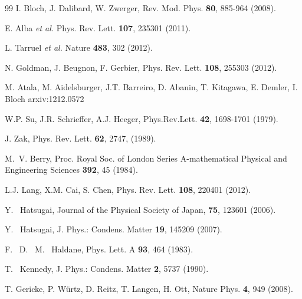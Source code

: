 \documentclass[pra,aps,twocolumn,showpacs]{revtex4}
\begin{document}
\begin{thebibliography}{99}
 I. Bloch, J. Dalibard, W. Zwerger, 
Rev. Mod. Phys. {\bf 80}, 885-964 (2008).

E. Alba {\it et al.} %
Phys. Rev. Lett. \textbf{107},  235301 (2011).

 L. Tarruel {\it et al.} %
Nature \textbf{483}, 302 (2012).

N. Goldman, J. Beugnon, F. Gerbier, 
Phys. Rev. Lett. \textbf{108}, 255303 (2012).


 M. Atala, M. Aidelsburger, J.T. Barreiro, D. Abanin, T. Kitagawa, E. Demler, I. Bloch
arxiv:1212.0572

W.P. Su, J.R. Schrieffer, A.J. Heeger, 
Phys.Rev.Lett. \textbf{42}, 1698-1701 (1979).

 J. Zak, Phys. Rev. Lett. \textbf{62},
  2747, (1989).

 M.~V. Berry,
  Proc. Royal Soc. of London Series
  A-mathematical Physical and Engineering Sciences
  \textbf{392}, 45 (1984).
  
L.J. Lang, X.M. Cai, S. Chen, 
Phys. Rev. Lett. \textbf{108}, 220401 (2012).

 Y.~ Hatsugai,
  Journal of the Physical Society of Japan,
  \textbf{75}, 123601 (2006).

 Y.~ Hatsugai,
 J. Phys.: Condens. Matter \textbf{19}, 145209 (2007).

 F.~ D.~ M.~ Haldane,
  Phys. Lett. A \textbf{93}, 464 (1983).  
      
 T.~ Kennedy,
J. Phys.: Condens. Matter \textbf{2}, 5737 (1990). 
  
 T. Gericke, P. W\"urtz, D. Reitz, T. Langen, H. Ott,
Nature Phys. \textbf{4}, 949 (2008).


\end{thebibliography}
\end{document}
